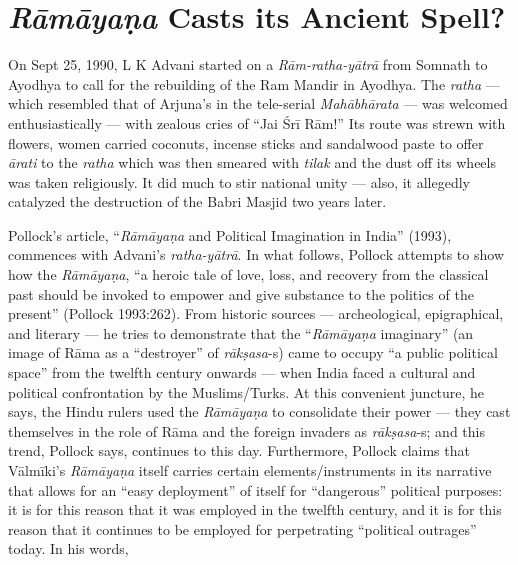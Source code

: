 \chapter{{\sl\bfseries Rāmāyaṇa} Casts its Ancient Spell?}\label{chapter3} 




On Sept 25, 1990, L K Advani started on a {\sl Rām-ratha-yātrā} from Somnath to Ayodhya to call for the rebuilding of the Ram Mandir in Ayodhya. The {\sl ratha} — which resembled that of Arjuna’s in the tele-serial {\sl Mahābhārata} — was welcomed enthusiastically — with zealous cries of “Jai Śrī Rām!” Its route was strewn with flowers, women carried coconuts, incense sticks and sandalwood paste to offer {\sl ārati} to the {\sl ratha} which was then smeared with {\sl tilak} and the dust off its wheels was taken religiously. It did much to stir national unity — also, it allegedly catalyzed the destruction of the Babri Masjid two years later.   

Pollock’s article, “{\sl Rāmāyaṇa} and Political Imagination in India” (1993), commences with Advani’s {\sl ratha-yātrā}. In what follows, Pollock attempts to show how the {\sl Rāmāyaṇa}, “a heroic tale of love, loss, and recovery from the classical past should be invoked to empower and give substance to the politics of the present” (Pollock 1993:262). From historic sources — archeological, epigraphical, and literary — he tries to demonstrate that the “{\sl Rāmāyaṇa} imaginary” (an image of Rāma as a “destroyer” of {\sl rākṣasa}-s) came to occupy “a public political space” from the twelfth century onwards — when India faced a cultural and political confrontation by the Muslims/Turks. At this convenient juncture, he says, the Hindu rulers used the {\sl Rāmāyaṇa} to consolidate their power — they cast themselves in the role of Rāma and the foreign invaders as {\sl rākṣasa}-s; and this trend, Pollock says, continues to this day. Furthermore, Pollock claims that Vālmīki’s {\sl Rāmāyaṇa} itself carries certain elements/instruments in its narrative that allows for an “easy deployment” of itself for “dangerous” political purposes: it is for this reason that it was employed in the twelfth century, and it is for this reason that it continues to be employed for perpetrating “political outrages” today. In his words,   

